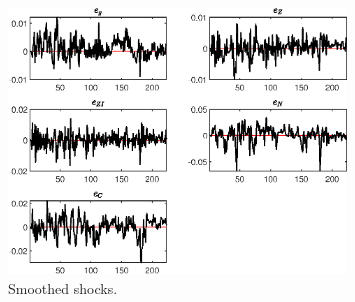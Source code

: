  
\begin{figure}[H]
\centering 
\includegraphics[width=0.80\textwidth]{RBC_growth/graphs/RBC_growth_SmoothedShocks1}
\caption{Smoothed shocks.}\label{Fig:SmoothedShocks:1}
\end{figure}


